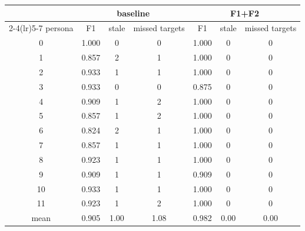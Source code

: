 \begin{tabular}{ccccccc}
\toprule
 & \multicolumn{3}{c}{baseline} & \multicolumn{3}{c}{F1+F2} \\
\cmidrule(lr){2-4}\cmidrule(lr){5-7}
persona & F1 & stale & missed targets & F1 & stale & missed targets \\
\midrule
0 & 1.000 & 0 & 0 & 1.000 & 0 & 0 \\
1 & 0.857 & 2 & 1 & 1.000 & 0 & 0 \\
2 & 0.933 & 1 & 1 & 1.000 & 0 & 0 \\
3 & 0.933 & 0 & 0 & 0.875 & 0 & 0 \\
4 & 0.909 & 1 & 2 & 1.000 & 0 & 0 \\
5 & 0.857 & 1 & 2 & 1.000 & 0 & 0 \\
6 & 0.824 & 2 & 1 & 1.000 & 0 & 0 \\
7 & 0.857 & 1 & 1 & 1.000 & 0 & 0 \\
8 & 0.923 & 1 & 1 & 1.000 & 0 & 0 \\
9 & 0.909 & 1 & 1 & 0.909 & 0 & 0 \\
10 & 0.933 & 1 & 1 & 1.000 & 0 & 0 \\
11 & 0.923 & 1 & 2 & 1.000 & 0 & 0 \\
mean & 0.905 & 1.00 & 1.08 & 0.982 & 0.00 & 0.00 \\
\bottomrule
\end{tabular}
